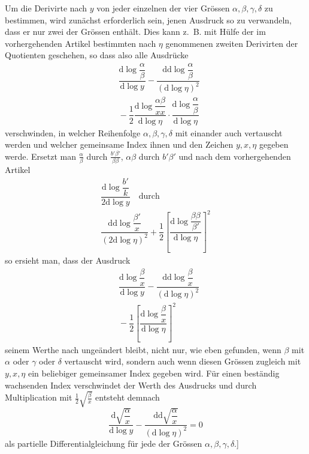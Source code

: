 
Um die Derivirte nach $y$ von jeder einzelnen der vier Grössen $\alpha,\allowbreak \beta,\allowbreak \gamma,\allowbreak \delta$ zu bestimmen, wird zunächst erforderlich sein, jenen Ausdruck so zu verwandeln, dass er nur zwei der Grössen enthält. Dies kann z.\ B. mit Hülfe der im vorhergehenden Artikel bestimmten nach $\eta$ genommenen zweiten Derivirten der Quotienten geschehen, so dass also alle Ausdrücke
\[
\begin{aligned}&\dfrac{\mathrm d\log\dfrac{\alpha}{\beta}}{\mathrm d\log y}
-\dfrac{\mathrm d\mathrm d\log\dfrac{\alpha}{\beta}}{(\mathrm d\log\eta)^2}
\\[8pt]&{}-\dfrac12\dfrac{\mathrm d\log\dfrac{\alpha\beta}{xx}}{\mathrm d\log\eta}
\cdot\dfrac{\mathrm d\log\dfrac{\alpha}{\beta}}{\mathrm d\log\eta}\end{aligned}
\]
verschwinden, in welcher Reihenfolge $\alpha,\allowbreak \beta,\allowbreak \gamma,\allowbreak \delta$ mit einander auch vertauscht werden und welcher gemeinsame Index ihnen und den Zeichen $y,\allowbreak x,\allowbreak \eta$ gegeben werde. Ersetzt man $\frac{\alpha}{\beta}$ durch $\frac{b'\beta'}{\beta\beta}$, $\alpha\beta$ durch $b'\beta'$ und nach dem vorhergehenden Artikel
\[
\begin{gathered}\dfrac{\mathrm d\log\dfrac{b'}{k}}{2\mathrm d\log y}
\quad\text{durch}\\[9pt]
\dfrac{\mathrm d\mathrm d\log\dfrac{\beta'}{x}}{(2\mathrm d\log\eta)^2}
+\dfrac12\left[\dfrac{\mathrm d\log\dfrac{\beta\beta}{\beta'}}{\mathrm d\log\eta}\right]^2\end{gathered}
\]
so ersieht man, dass der Ausdruck
\[
\begin{aligned}&\dfrac{\mathrm d\log\dfrac{\beta}{x}}{\mathrm d\log y}
-\dfrac{\mathrm d\mathrm d\log\dfrac{\beta}{x}}{(\mathrm d\log\eta)^2}
\\[8pt]&{}-\dfrac12\left[\dfrac{\mathrm d\log\dfrac{\beta}{x}}{\mathrm d\log\eta}\right]^2\end{aligned}
\]
seinem Werthe nach ungeändert bleibt, nicht nur, wie eben gefunden, wenn $\beta$ mit $\alpha$ oder $\gamma$ oder $\delta$ vertauscht wird, sondern auch wenn diesen Grössen zugleich mit $y,\allowbreak x,\allowbreak \eta$ ein beliebiger gemeinsamer Index gegeben wird. Für einen beständig wachsenden Index verschwindet der Werth des Ausdrucks und durch Multiplication mit $\frac12\surd {\frac{\beta}{x}}$ entsteht demnach
\[
\dfrac{\mathrm d\surd {\dfrac{\alpha}{x}}}{\mathrm d\log y}
-\dfrac{\mathrm d\mathrm d\surd {\dfrac{\alpha}{x}}}{(\mathrm d\log\eta)^2}=0
\]
als partielle Differentialgleichung für jede der Grössen $\alpha,\allowbreak \beta,\allowbreak \gamma,\allowbreak \delta$.]

